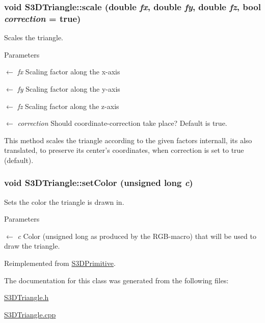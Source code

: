 \hypertarget{class_s3_d_triangle_acad24a5cbc1ab7526df25383dd739f00}{
\subsubsection[{scale}]{\setlength{\rightskip}{0pt plus 5cm}void S3DTriangle::scale (double {\em fx}, \/  double {\em fy}, \/  double {\em fz}, \/  bool {\em correction} = {\ttfamily true})}}
\label{class_s3_d_triangle_acad24a5cbc1ab7526df25383dd739f00}


Scales the triangle. 


\begin{DoxyParams}{Parameters}
\item[\mbox{$\leftarrow$} {\em fx}]Scaling factor along the x-\/axis \item[\mbox{$\leftarrow$} {\em fy}]Scaling factor along the y-\/axis \item[\mbox{$\leftarrow$} {\em fz}]Scaling factor along the z-\/axis \item[\mbox{$\leftarrow$} {\em correction}]Should coordinate-\/correction take place? Default is true.\end{DoxyParams}
This method scales the triangle according to the given factors internall, its also translated, to preserve its center's coordinates, when correction is set to true (default). \hypertarget{class_s3_d_triangle_a2c60503c3bae194ec8247a0e2467c915}{
\subsubsection[{setColor}]{\setlength{\rightskip}{0pt plus 5cm}void S3DTriangle::setColor (unsigned long {\em c})}}
\label{class_s3_d_triangle_a2c60503c3bae194ec8247a0e2467c915}


Sets the color the triangle is drawn in. 


\begin{DoxyParams}{Parameters}
\item[\mbox{$\leftarrow$} {\em c}]Color (unsigned long as produced by the RGB-\/macro) that will be used to draw the triangle. \end{DoxyParams}


Reimplemented from \hyperlink{class_s3_d_primitive_a1c8f036193987522bdfb6a49b9b74000}{S3DPrimitive}.



The documentation for this class was generated from the following files:\begin{DoxyCompactItemize}
\item 
\hyperlink{_s3_d_triangle_8h}{S3DTriangle.h}\item 
\hyperlink{_s3_d_triangle_8cpp}{S3DTriangle.cpp}\end{DoxyCompactItemize}
